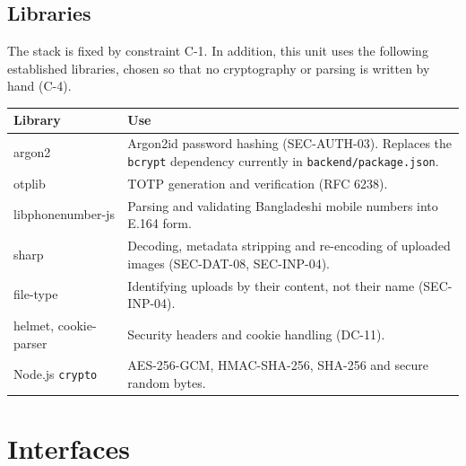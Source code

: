 \documentclass[11pt,a4paper]{article}
\newenvironment{dtable}[1]{\small\begin{longtable}{#1}}{\end{longtable}}
\begin{document}
\subsection{Libraries}
The stack is fixed by constraint C-1. In addition, this unit uses the following established libraries, chosen so that no cryptography or parsing is written by hand (C-4).
\begin{dtable}{@{}>{\ttfamily}p{3.4cm}>{\raggedright\arraybackslash}p{11.8cm}@{}}
\toprule
\textnormal{\textbf{Library}} & \textbf{Use} \\ \midrule \endhead
argon2 & Argon2id password hashing (SEC-AUTH-03). Replaces the \texttt{bcrypt} dependency currently in \texttt{backend/package.json}. \\
otplib & TOTP generation and verification (RFC 6238). \\
libphonenumber-js & Parsing and validating Bangladeshi mobile numbers into E.164 form. \\
sharp & Decoding, metadata stripping and re-encoding of uploaded images (SEC-DAT-08, SEC-INP-04). \\
file-type & Identifying uploads by their content, not their name (SEC-INP-04). \\
helmet, cookie-parser & Security headers and cookie handling (DC-11). \\
Node.js \texttt{crypto} & AES-256-GCM, HMAC-SHA-256, SHA-256 and secure random bytes. \\
\bottomrule
\end{dtable}
\section{Interfaces}
\end{document}

